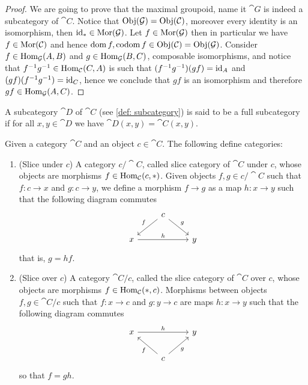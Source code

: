 \begin{proof}
  We are going to prove that the maximal groupoid, name it \(\cat G\) is indeed
  a subcategory of \(\cat C\). Notice that \(\operatorname{Obj}(\mathcal G) = \operatorname{Obj}(\mathcal C)\),
  moreover every identity is an isomorphism, then \(\operatorname{id}_{*} \in \operatorname{Mor}(\mathcal G)\).
  Let \(f \in \operatorname{Mor}(\mathcal G)\) then in particular we have \(f \in \operatorname{Mor}(\mathcal C)\)
  and hence \(\operatorname{dom} f, \operatorname{codom} f \in \operatorname{Obj}(\mathcal C) =
  \operatorname{Obj}(\mathcal G)\). Consider \(f \in \operatorname{Hom}_{\mathcal G}(A, B)\) and \(g \in \operatorname{Hom}_{\mathcal
  G}(B, C)\), composable isomorphisms, and notice that \(f^{-1}  g^{-1}
  \in \operatorname{Hom}_{\mathcal C}(C, A)\) is such that \((f^{-1}  g^{-1})  (g
  f) = \operatorname{id}_A\) and \((g  f)  (f^{-1}  g^{-1}) = \operatorname{id}_C\), hence we
  conclude that \(g  f\) is an isomorphism and therefore \(g  f \in
  \operatorname{Hom}_{\mathcal G}(A, C)\).
\end{proof}

\begin{definition}\label{def: full subcategory}
  A subcategory \(\cat D\) of \(\cat C\) (see \cref{def: subcategory}) is said
  to be a full subcategory if for all \(x, y \in \cat D\) we have \(\cat D(x, y)
  = \cat C(x, y)\).
\end{definition}

\begin{proposition}\label{prop: slice cat}
  Given a category \(\cat C\) and an object \(c \in \cat C\). The following
  define categories:
  \begin{enumerate}[(SC1)]
    \item\label{prop: slice under}
      (Slice under \(c\)) A category \(c/\cat C\), called slice category of
      \(\cat C\) under \(c\), whose objects are morphisms \(f \in \operatorname{Hom}_{\mathcal
      C}(c, *)\). Given objects \(f, g \in c/\cat C\) such that \(f: c \to x\)
      and \(g: c \to y\), we define a morphism \(f \to g\) as a map \(h: x \to
      y\) such that the following diagram commutes
      \[
        \begin{tikzcd}
          &c \ar[dl, swap,"f"] \ar[dr, "g"]\\
          x \ar[rr, "h"] & &y
        \end{tikzcd}
      \]
      that is, \(g = h  f\).
    \item\label{prop: slice over}
      (Slice over \(c\)) A category \(\cat C/c\), called the slice category of
      \(\cat C\) over \(c\), whose objects are morphisms \(f \in \operatorname{Hom}_{\mathcal
      C}(*, c)\). Morphisms between objects \(f, g \in \cat C/c\) such that \(f:
      x \to c\) and \(g: y \to c\) are maps \(h: x \to y\) such that the
      following diagram commutes
      \[
        \begin{tikzcd}
          x \ar[rr, "h"]
            & &y \\
            &c \ar[ul, "f"] \ar[ur, swap, "g"]
        \end{tikzcd}
      \]
      so that \(f = g  h\).
  \end{enumerate}
\end{proposition}

